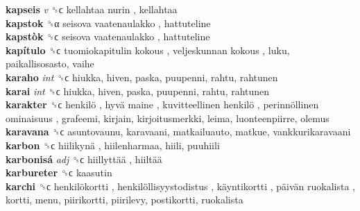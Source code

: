 \textbf{kapseis} \emph{v}  ␝ϲ   kellahtaa nurin , kellahtaa  \\
\textbf{kapstok} ␝α   seisova vaatenaulakko , hattuteline  \\
\textbf{kapstòk} ␝ϲ   seisova vaatenaulakko , hattuteline  \\
\textbf{kapítulo} ␝ϲ   tuomiokapitulin kokous ,  veljeskunnan kokous , luku, paikallisosasto, vaihe  \\
\textbf{karaho} \emph{int}  ␝ϲ  hiukka, hiven, paska, puupenni, rahtu, rahtunen  \\
\textbf{karai} \emph{int}  ␝ϲ  hiukka, hiven, paska, puupenni, rahtu, rahtunen  \\
\textbf{karakter} ␝ϲ   henkilö ,  hyvä maine ,  kuvitteellinen henkilö ,  perinnöllinen ominaisuus , grafeemi, kirjain, kirjoitusmerkki, leima, luonteenpiirre, olemus  \\
\textbf{karavana} ␝ϲ  asuntovaunu, karavaani, matkailuauto, matkue, vankkurikaravaani  \\
\textbf{karbon} ␝ϲ   hiilikynä , hiilenharmaa, hiili, puuhiili  \\
\textbf{karbonisá} \emph{adj}  ␝ϲ   hiillyttää ,  hiiltää   \\
\textbf{karbureter} ␝ϲ  kaasutin  \\
\textbf{karchi} ␝ϲ   henkilökortti ,  henkilöllisyystodistus ,  käyntikortti ,  päivän ruokalista , kortti, menu, piirikortti, piirilevy, postikortti, ruokalista  \\
